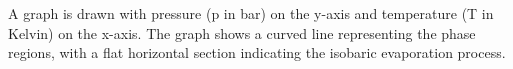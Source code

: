 A graph is drawn with pressure (p in bar) on the y-axis and temperature (T in Kelvin) on the x-axis. The graph shows a curved line representing the phase regions, with a flat horizontal section indicating the isobaric evaporation process.